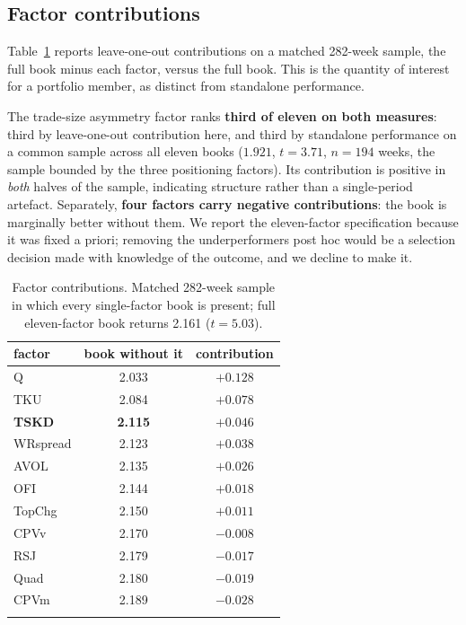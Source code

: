\documentclass[11pt,letterpaper]{article}
\begin{document}
\subsection{Factor contributions}

Table~\ref{tab:loo} reports leave-one-out contributions on a matched 282-week
sample, the full book minus each factor, versus the full book. This is the
quantity of interest for a portfolio member, as distinct from standalone
performance.

The trade-size asymmetry factor ranks \textbf{third of eleven on both measures}:
third by leave-one-out contribution here, and third by standalone performance on
a common sample across all eleven books ($1.921$, $t=3.71$, $n=194$ weeks, the
sample bounded by the three positioning factors). Its contribution is positive in
\emph{both} halves of the sample, indicating structure rather than a
single-period artefact. Separately, \textbf{four factors carry negative
contributions}: the book is marginally better without them. We
report the eleven-factor specification because it was fixed a priori; removing
the underperformers post hoc would be a selection decision made with knowledge of
the outcome, and we decline to make it.

\begin{table}[!htbp]\centering
\caption{Factor contributions. Matched 282-week sample in which every single-factor book is present; full
eleven-factor book returns 2.161 ($t=5.03$).}\label{tab:loo}
\begin{tabular}{lcc}
\toprule
factor & book without it & contribution \\
\midrule\addlinespace[2pt]
Q & 2.033 & $+0.128$ \\
TKU & 2.084 & $+0.078$ \\
\textbf{TSKD} & \textbf{2.115} & $\mathbf{+0.046}$ \\
WRspread & 2.123 & $+0.038$ \\
AVOL & 2.135 & $+0.026$ \\
OFI & 2.144 & $+0.018$ \\
TopChg & 2.150 & $+0.011$ \\
CPVv & 2.170 & $-0.008$ \\
RSJ & 2.179 & $-0.017$ \\
Quad & 2.180 & $-0.019$ \\
CPVm & 2.189 & $-0.028$ \\
\addlinespace[2pt]
\bottomrule
\end{tabular}
\end{table}
\end{document}
